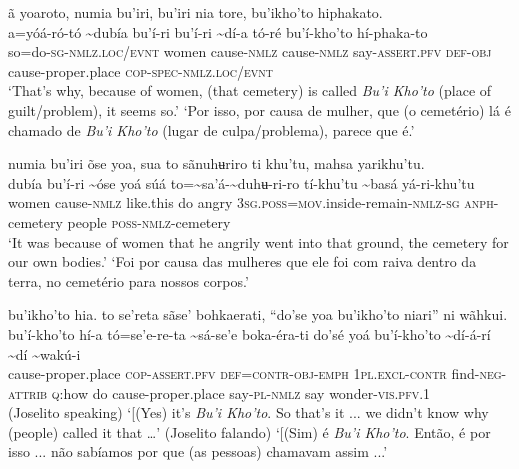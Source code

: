 \documentclass[output=paper,
modfonts,nonflat
]{langsci/langscibook}
\begin{document}
\ea ã yoaroto, numia bu'iri, bu'iri nia tore, bu'ikho'to hiphakato. \\[.3em]
\gll {\textasciitilde}a=yóá-ró-tó	{\textasciitilde}dubía	bu'í-ri	bu'í-ri	{\textasciitilde}dí-a	tó-ré bu'í-kho'to	hí-phaka-to\\
     so=do-\textsc{sg-nmlz.loc/evnt}	women	cause\textsc{-nmlz}	cause\textsc{-nmlz}	say-\textsc{assert.pfv}	\textsc{def-obj} cause-proper.place	\textsc{cop-spec-nmlz.loc/evnt}\\
\glt ‘That's why, because of women, (that cemetery) is called \textit{Bu'i Kho’to} (place of guilt/problem), it seems so.’
\glt ‘Por isso, por causa de mulher, que (o cemetério) lá é chamado de \textit{Bu'i Kho’to} (lugar de culpa/problema), parece que é.’
\z 

\ea numia bu'iri õse yoa, sua to sãnuhʉriro ti khu'tu, mahsa yarikhu'tu.\\[.3em]
\gll {\textasciitilde}dubía	bu'í-ri	{\textasciitilde}óse	yoá	súá	to={\textasciitilde}sa'á-{\textasciitilde}duhʉ-ri-ro tí-khu'tu{\footnotemark}	{\textasciitilde}basá	yá-ri-khu'tu\\
     women	cause\textsc{-nmlz}	like.this	do	angry	3\textsc{sg.poss}=\textsc{mov.}inside-remain\textsc{-nmlz-sg} \textsc{anph}-cemetery	people	\textsc{poss-nmlz}-cemetery\\
\glt ‘It was because of women that he angrily went into that ground, the cemetery for our own bodies.’
\newpage 
\glt ‘Foi por causa das mulheres que ele foi com raiva dentro da terra, no cemetério para nossos corpos.’
\z

\ea bu'ikho'to hia. to se'reta sãse' bohkaerati, “do'se yoa bu'ikho'to niari” ni wãhkui. \\[.3em]
\gll bu'í-kho'to	hí-a	tó=se'e-re-ta	{\textasciitilde}sá-se'e	boka-éra-ti do'sé	yoá	bu'í-kho'to	{\textasciitilde}dí-á-rí	{\textasciitilde}dí	{\textasciitilde}wakú-i\\
     cause-proper.place	\textsc{cop-assert.pfv}	\textsc{def=contr-obj-emph}	1\textsc{pl.excl-contr}	find\textsc{-neg-attrib} \textsc{q:}how	do	cause-proper.place	say\textsc{-pl}\textsc{-nmlz}	say	wonder-\textsc{vis.pfv.}1 \\
\glt (Joselito speaking) ‘[(Yes) it's \textit{Bu'i Kho'to}. So that's it ... we didn't know why (people) called it that …’ 
\glt (Joselito falando) ‘[(Sim) é \textit{Bu'i Kho'to}. Então, é por isso ... não sabíamos por que (as pessoas) chamavam assim ...’ 
\z 
\end{document}
